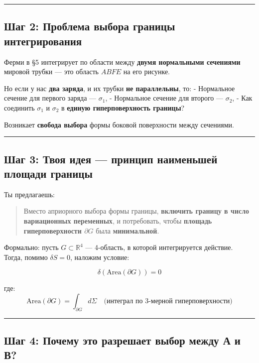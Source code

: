 \documentclass[11pt]{article}
\begin{document}
\begin{center}\rule{0.5\linewidth}{\linethickness}\end{center}

\subsection{ Шаг 2: Проблема выбора границы интегрирования}

Ферми в §5 интегрирует по области между \textbf{двумя нормальными
сечениями} мировой трубки --- это область \(ABFE\) на его рисунке.

Но если у нас \textbf{два заряда}, и их трубки \textbf{не параллельны},
то: - Нормальное сечение для первого заряда --- \(\sigma_1\), -
Нормальное сечение для второго --- \(\sigma_2\), - Как соединить
\(\sigma_1\) и \(\sigma_2\) в \textbf{единую гиперповерхность границы}?

 Возникает \textbf{свобода выбора} формы боковой поверхности между
сечениями.

\begin{center}\rule{0.5\linewidth}{\linethickness}\end{center}

\subsection{ Шаг 3: Твоя идея --- принцип наименьшей площади границы}

Ты предлагаешь:

\begin{quote}
Вместо априорного выбора формы границы, \textbf{включить границу в число
вариационных переменных}, и потребовать, чтобы \textbf{площадь
гиперповерхности \(\partial G\)} была \textbf{минимальной}.
\end{quote}

Формально: пусть \(G \subset \mathbb{R}^4\) --- 4-область, в которой
интегрируется действие.\\
Тогда, помимо \(\delta S = 0\), наложим условие:

\[
\delta \left( \text{Area}(\partial G) \right) = 0
\]

где: \[
\text{Area}(\partial G) = \int_{\partial G} d\Sigma
\quad \text{(интеграл по 3-мерной гиперповерхности)}
\]

\begin{center}\rule{0.5\linewidth}{\linethickness}\end{center}

\subsection{ Шаг 4: Почему это разрешает выбор между А и В?}
\end{document}
